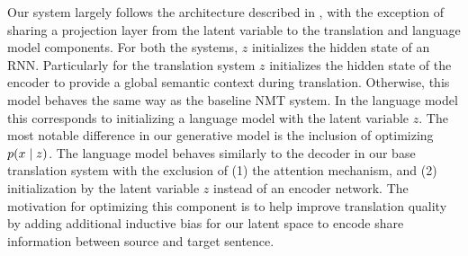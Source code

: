 Our system largely follows the architecture described in \citet{eikema2018AEVNMT}, with the exception of sharing a projection layer from the latent variable to the translation and language model components. For both the systems, $z$ initializes the hidden state of an \ac{RNN}. Particularly for the translation system $z$  initializes the hidden state of the encoder to provide a global semantic context during translation. Otherwise, this model behaves the same way as the baseline \ac{NMT} system. In the language model this corresponds to initializing a language model with the latent variable $z$.
The most notable difference in our generative model is the inclusion of optimizing $p(x \; | \;{z})$. The language model behaves similarly to the decoder in our base translation system with the exclusion of (1) the attention mechanism, and (2) initialization by the latent variable $z$ instead of an encoder network. The motivation for optimizing this component is to help improve translation quality by adding additional inductive bias for our latent space to encode share information between source and target sentence. %





